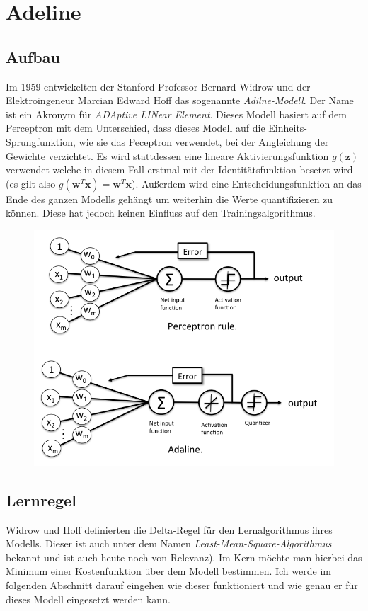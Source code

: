 \section{Adeline}

\subsection{Aufbau}

Im 1959 entwickelten der Stanford Professor Bernard Widrow und der Elektroingeneur Marcian Edward Hoff das sogenannte \emph{Adilne-Modell}. Der Name ist ein Akronym für \emph{ADAptive LINear Element}. Dieses Modell basiert auf dem Perceptron mit dem Unterschied, dass dieses Modell auf die Einheits-Sprungfunktion, wie sie das Peceptron verwendet, bei der Angleichung der Gewichte verzichtet. Es wird stattdessen eine lineare Aktivierungsfunktion $g(\mathbf{z})$ verwendet welche in diesem Fall erstmal mit der Identitätsfunktion besetzt wird (es gilt also $g(\mathbf{w}^T\mathbf{x}) = \mathbf{w}^T\mathbf{x}$). Außerdem wird eine Entscheidungsfunktion an das Ende des ganzen Modells gehängt um weiterhin die Werte quantifizieren zu können. Diese hat jedoch keinen Einfluss auf den Trainingsalgorithmus. 

\begin{figure}[!htb]
	\centering
	\includegraphics[width=.8\linewidth]{img/adeline_aufbau}
	\label{fig:ad_aufbau}
\end{figure}


\subsection{Lernregel}

Widrow und Hoff definierten die Delta-Regel für den Lernalgorithmus ihres Modells. Dieser ist auch unter dem Namen \emph{Least-Mean-Square-Algorithmus} bekannt und ist auch heute noch von Relevanz). Im Kern möchte man hierbei das Minimum einer Kostenfunktion über dem Modell bestimmen. Ich werde im folgenden Abschnitt darauf eingehen wie dieser funktioniert und wie genau er für dieses Modell eingesetzt werden kann. 

